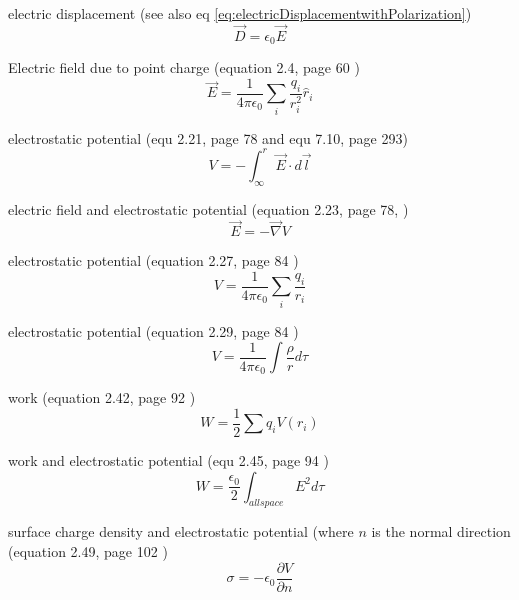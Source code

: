 \documentclass[12pt]{article}  %
\begin{document}
electric displacement (see also eq \ref{eq:electricDisplacementwithPolarization})
\begin{equation}
\vec{D} = \epsilon_0 \vec{E}
	\label{eq:electricDisplacement}
\end{equation}

Electric field due to point charge (equation 2.4, page 60 \cite{GriffithED})
\begin{equation}
\vec{E} = \frac{1}{4 \pi \epsilon_0} \sum_i \frac{q_i}{r_i^2} \hat{r}_i
\end{equation}


electrostatic potential (equ 2.21, page 78 and equ 7.10, page 293\cite{GriffithED})
\begin{equation}
V = - \int^r_{\infty} \vec{E}\cdot d\vec{l}
\end{equation}

electric field and electrostatic potential (equation 2.23, page 78,  \cite{GriffithED})
\begin{equation}
  \vec{E} = -\vec{\nabla}V
	\label{eq:electric_field_potential}
\end{equation}

electrostatic potential (equation 2.27, page 84 \cite{GriffithED})
\begin{equation}
 V = \frac{1}{4 \pi \epsilon_0} \sum_i \frac{q_i}{r_i}
\end{equation}

electrostatic potential (equation 2.29, page 84 \cite{GriffithED})
\begin{equation}
 V = \frac{1}{4 \pi \epsilon_0} \int \frac{\rho}{r} d \tau
\end{equation}

work (equation 2.42, page 92  \cite{GriffithED})
\begin{equation}
  W = \frac{1}{2} \sum q_i V(r_i)
\end{equation}

work and electrostatic potential (equ 2.45, page 94 \cite{GriffithED})
\begin{equation}
  W = \frac{\epsilon_0}{2} \int_{all space} E^2 d \tau
\label{eq:work_in_electric_field}
\end{equation}

surface charge density and electrostatic potential (where $n$ is the normal direction \\ (equation 2.49, page 102  \cite{GriffithED})
\begin{equation}
\sigma = -\epsilon_0 \frac{\partial V}{\partial n}
\label{eq:surfacechargedensity}
\end{equation}
\end{document}
